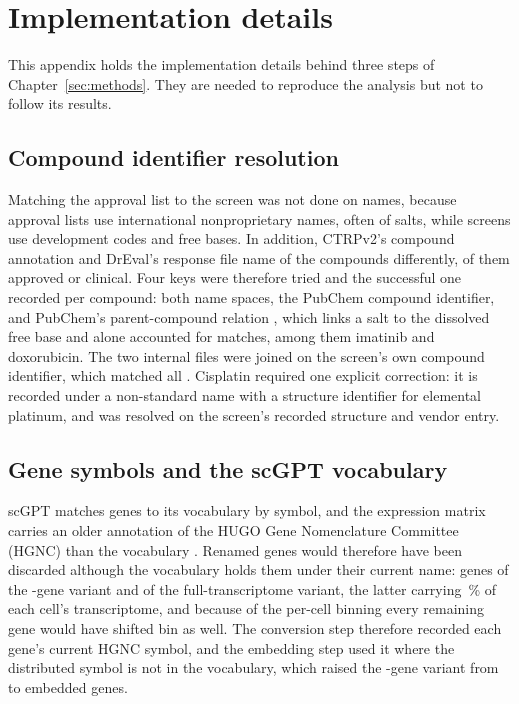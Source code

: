 \chapter{Implementation details}
\label{app:implementation}

This appendix holds the implementation details behind three steps of Chapter~\ref{sec:methods}. They
are needed to reproduce the analysis but not to follow its results.

\section{Compound identifier resolution}
\label{app:ids}

Matching the approval list to the screen was not done on names, because approval lists use
international nonproprietary names, often of salts, while screens use development codes and free bases.
In addition, CTRPv2's compound annotation \cite{ctrpv2} and DrEval's response file \cite{dreval} name
\NameMismatch{} of the \NDrugs{} compounds differently, \NameMismatchFda{} of them approved or clinical. Four keys were therefore
tried and the successful one recorded per compound: both name spaces, the PubChem compound identifier,
and PubChem's parent-compound relation \cite{pubchem}, which links a salt to the dissolved free base and
alone accounted for \NParentMatch{} matches, among them imatinib and doxorubicin. The two internal files were joined
on the screen's own compound identifier, which matched all \NDrugs{}. Cisplatin required one explicit
correction: it is recorded under a non-standard name with a structure identifier for elemental
platinum, and was resolved on the screen's recorded structure and vendor entry.

\section{Gene symbols and the scGPT vocabulary}
\label{app:hgnc}

scGPT matches genes to its vocabulary by symbol, and the expression matrix carries an older annotation of
the HUGO Gene Nomenclature Committee (HGNC) than the vocabulary \cite{hgnc}. Renamed genes would therefore
have been discarded although the vocabulary holds them under their current name: \NRescuedHvg{} genes of
the \NHvg-gene variant and \NRescuedAll{} of the full-transcriptome variant, the latter carrying
\PctRescuedAll\,\% of each cell's transcriptome, and because of the per-cell binning every remaining gene
would have shifted bin as well. The conversion step therefore recorded each gene's current HGNC symbol,
and the embedding step used it where the distributed symbol is not in the vocabulary, which raised the
\NHvg-gene variant from \NVocabDirect{} to \NVocab{} embedded genes.

